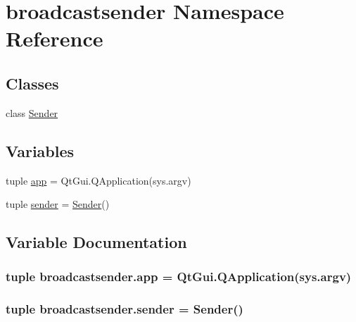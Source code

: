 \hypertarget{namespacebroadcastsender}{}\section{broadcastsender Namespace Reference}
\label{namespacebroadcastsender}
\subsection*{Classes}
\begin{DoxyCompactItemize}
\item 
class \hyperlink{classbroadcastsender_1_1Sender}{Sender}
\end{DoxyCompactItemize}
\subsection*{Variables}
\begin{DoxyCompactItemize}
\item 
tuple \hyperlink{namespacebroadcastsender_a689360c7ea58bb977d241d635f0cbd22}{app} = Qt\+Gui.\+Q\+Application(sys.\+argv)
\item 
tuple \hyperlink{namespacebroadcastsender_acf2a8c28c0566f97acd6b1654e88cefb}{sender} = \hyperlink{classbroadcastsender_1_1Sender}{Sender}()
\end{DoxyCompactItemize}


\subsection{Variable Documentation}
\hypertarget{namespacebroadcastsender_a689360c7ea58bb977d241d635f0cbd22}{}
\subsubsection[{app}]{\setlength{\rightskip}{0pt plus 5cm}tuple broadcastsender.\+app = Qt\+Gui.\+Q\+Application(sys.\+argv)}\label{namespacebroadcastsender_a689360c7ea58bb977d241d635f0cbd22}
\hypertarget{namespacebroadcastsender_acf2a8c28c0566f97acd6b1654e88cefb}{}
\subsubsection[{sender}]{\setlength{\rightskip}{0pt plus 5cm}tuple broadcastsender.\+sender = {\bf Sender}()}\label{namespacebroadcastsender_acf2a8c28c0566f97acd6b1654e88cefb}

